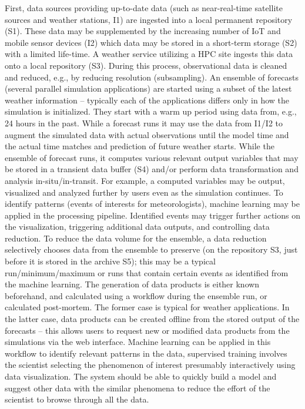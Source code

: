 \documentclass[a4paper, twocolumn]{article}
\begin{document}
First, data sources providing up-to-date data (such as near-real-time satellite sources and weather stations, I1) are ingested into a local permanent repository (S1). These data may be supplemented by the increasing number of IoT and mobile sensor devices (I2) which data may be stored in a short-term storage (S2) with a limited life-time.
A weather service utilizing a HPC site ingests this data onto a local repository (S3). During this process, observational data is cleaned and reduced, e.g., by reducing resolution (subsampling).
An ensemble of forecasts (several parallel simulation applications) are started using a subset of the latest weather information -- typically each of the applications differs only in how the simulation is initialized.
They start with a warm up period using data from, e.g., 24 hours in the past. While a forecast runs it may use the data from I1/I2 to augment the simulated data with actual observations until the model time and the actual time matches and prediction of future weather starts.
While the ensemble of forecast runs, it computes various relevant output variables that may be stored in a transient data buffer (S4) and/or perform data transformation and analysis in-situ/in-transit. For example, a computed variables may be output, visualized and analyzed further by users even as the simulation continues. To identify patterns (events of interests for meteorologists), machine learning may be applied in the processing pipeline. Identified events may trigger further actions on the visualization, triggering additional data outputs, and controlling data reduction. To reduce the data volume for the ensemble, a data reduction selectively chooses data from the ensemble to preserve (on the repository S3, just before it is stored in the archive S5); this may be a typical run/minimum/maximum or runs that contain certain events as identified from the machine learning.
The generation of data products is either known beforehand, and calculated using a workflow during the ensemble run, or calculated post-mortem.
The former case is typical for weather applications. In the latter case, data products can be created offline from the stored output of the forecasts -- this allows users to request new or modified data products from the simulations via the web interface.
Machine learning can be applied in this workflow to identify relevant patterns in the data, supervised training involves the scientist selecting the phenomenon of interest presumably interactively using data visualization. The system should be able to quickly build a model and suggest other data with the similar phenomena to reduce the effort of the scientist to browse through all the data.
\end{document}
